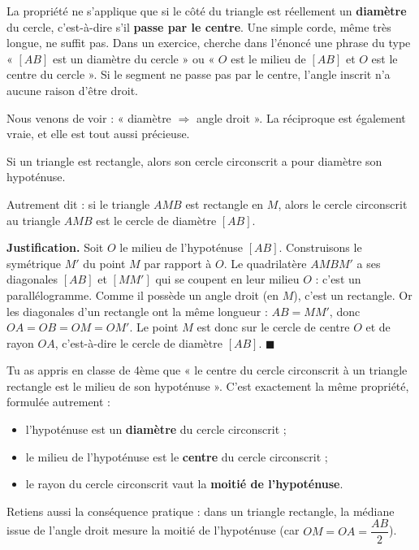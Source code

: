 \documentclass[11pt]{article}
\newcommand{\cle}[1]{{\popxbold\color{popdark}#1}}
\newcounter{popsec}
\newcounter{popsub}
\newcommand{\courssub}[1]{%
  \stepcounter{popsub}%
  \par\vspace{9pt}\noindent{\popxbold\fontsize{11.5}{13}\selectfont\color{popink}{\color{poporange}\thepopsec.\thepopsub}\hspace{6pt}#1}\par\nopagebreak\vspace{4pt}
}
\begin{document}
\begin{attention}
La propriété ne s'applique que si le côté du triangle est réellement un \textbf{diamètre} du cercle, c'est-à-dire s'il \textbf{passe par le centre}. Une simple corde, même très longue, ne suffit pas. Dans un exercice, cherche dans l'énoncé une phrase du type « $[AB]$ est un diamètre du cercle » ou « $O$ est le milieu de $[AB]$ et $O$ est le centre du cercle ». Si le segment ne passe pas par le centre, l'angle inscrit n'a aucune raison d'être droit.
\end{attention}

\courssub{La propriété réciproque}

Nous venons de voir : « diamètre $\Rightarrow$ angle droit ». La réciproque est également vraie, et elle est tout aussi précieuse.

\begin{propriete}[Réciproque]
Si un triangle est \cle{rectangle}, alors son cercle circonscrit a pour \cle{diamètre} son hypoténuse.

Autrement dit : si le triangle $AMB$ est rectangle en $M$, alors le cercle circonscrit au triangle $AMB$ est le cercle de diamètre $[AB]$.
\end{propriete}

\textbf{Justification.} Soit $O$ le milieu de l'hypoténuse $[AB]$. Construisons le symétrique $M'$ du point $M$ par rapport à $O$. Le quadrilatère $AMBM'$ a ses diagonales $[AB]$ et $[MM']$ qui se coupent en leur milieu $O$ : c'est un parallélogramme. Comme il possède un angle droit (en $M$), c'est un \cle{rectangle}. Or les diagonales d'un rectangle ont la même longueur : $AB = MM'$, donc $OA = OB = OM = OM'$. Le point $M$ est donc sur le cercle de centre $O$ et de rayon $OA$, c'est-à-dire le cercle de diamètre $[AB]$. \hfill$\blacksquare$

\begin{aretenir}
Tu as appris en classe de 4ème que « le centre du cercle circonscrit à un triangle rectangle est le milieu de son hypoténuse ». C'est exactement la même propriété, formulée autrement :
\begin{itemize}
  \item l'hypoténuse est un \textbf{diamètre} du cercle circonscrit ;
  \item le milieu de l'hypoténuse est le \textbf{centre} du cercle circonscrit ;
  \item le rayon du cercle circonscrit vaut la \textbf{moitié de l'hypoténuse}.
\end{itemize}
Retiens aussi la conséquence pratique : dans un triangle rectangle, la médiane issue de l'angle droit mesure la moitié de l'hypoténuse (car $OM = OA = \dfrac{AB}{2}$).
\end{aretenir}
\end{document}
